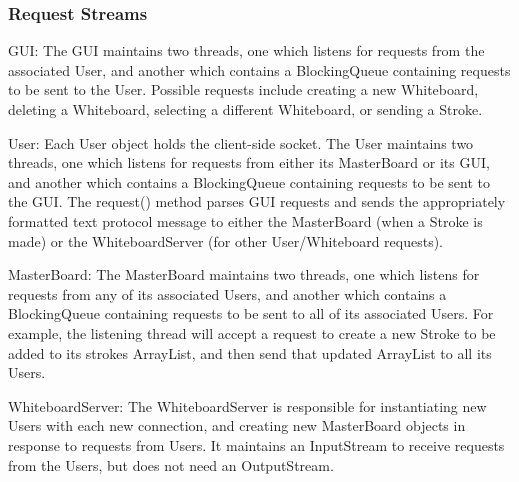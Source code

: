\subsubsection{Request Streams}

GUI: The GUI maintains two threads, one which listens for requests from the associated User, and another which contains a BlockingQueue containing requests to be sent to the User. Possible requests include creating a new Whiteboard, deleting a Whiteboard, selecting a different Whiteboard, or sending a Stroke.

User: Each User object holds the client-side socket. The User maintains two threads, one which listens for requests from either its MasterBoard or its GUI, and another which contains a BlockingQueue containing requests to be sent to the GUI. The request() method parses GUI requests and sends the appropriately formatted text protocol message to either the MasterBoard (when a Stroke is made) or the WhiteboardServer (for other User/Whiteboard requests).

MasterBoard: The MasterBoard maintains two threads, one which listens for requests from any of its associated Users, and another which contains a BlockingQueue containing requests to be sent to all of its associated Users. For example, the listening thread will accept a request to create a new Stroke to be added to its strokes ArrayList, and then send that updated ArrayList to all its Users.

WhiteboardServer: The WhiteboardServer is responsible for instantiating new Users with each new connection, and creating new MasterBoard objects in response to requests from Users. It maintains an InputStream to receive requests from the Users, but does not need an OutputStream.